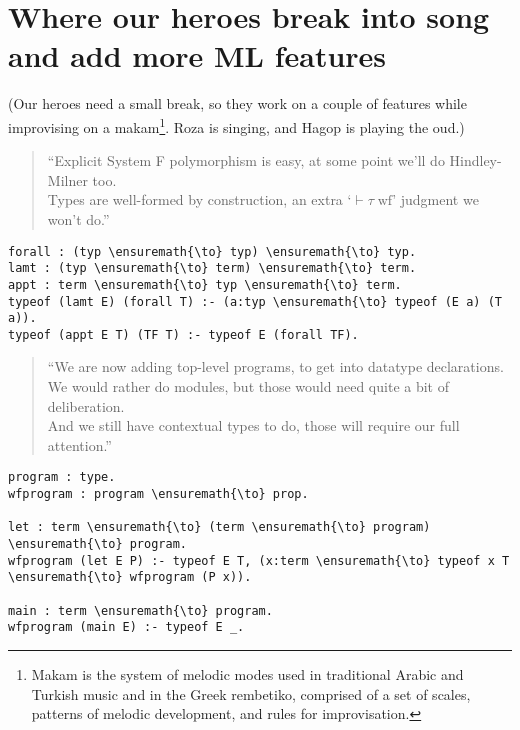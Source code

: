\section{Where our heroes break into song and add more ML
features}\label{where-our-heroes-break-into-song-and-add-more-ml-features}



\begin{scenecomment}
(Our heroes need a small break, so they work on a couple of features while improvising on a makam\footnote{Makam is the system of melodic modes used in traditional Arabic and Turkish music and in the Greek rembetiko, comprised of a set of scales, patterns of melodic development, and rules for improvisation.}. Roza is singing, and Hagop is playing the oud.)
\end{scenecomment}

\begin{verse}
``Explicit System F polymorphism is easy, at some point we'll do Hindley-Milner too. \\
Types are well-formed by construction, an extra `$\vdash \tau \; \text{wf}$' judgment we won't do.''
\end{verse}

\begin{verbatim}
forall : (typ \ensuremath{\to} typ) \ensuremath{\to} typ.
lamt : (typ \ensuremath{\to} term) \ensuremath{\to} term.
appt : term \ensuremath{\to} typ \ensuremath{\to} term.
typeof (lamt E) (forall T) :- (a:typ \ensuremath{\to} typeof (E a) (T a)).
typeof (appt E T) (TF T) :- typeof E (forall TF).
\end{verbatim}

\begin{verse}
``We are now adding top-level programs, to get into datatype declarations. \\
We would rather do modules, but those would need quite a bit of deliberation. \\
And we still have contextual types to do, those will require our full attention.''
\end{verse}

\begin{verbatim}
program : type.
wfprogram : program \ensuremath{\to} prop.

let : term \ensuremath{\to} (term \ensuremath{\to} program) \ensuremath{\to} program.
wfprogram (let E P) :- typeof E T, (x:term \ensuremath{\to} typeof x T \ensuremath{\to} wfprogram (P x)).

main : term \ensuremath{\to} program.
wfprogram (main E) :- typeof E _.
\end{verbatim}

